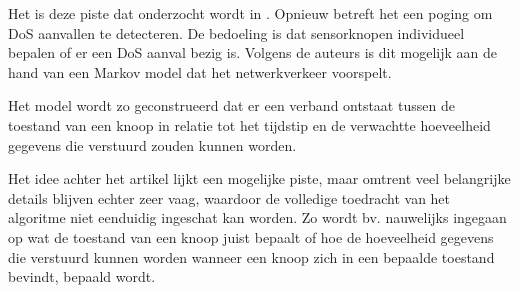 Het is deze piste dat onderzocht wordt in \citep{zhijie2012intrusion}. Opnieuw
betreft het een poging om DoS aanvallen te detecteren. De bedoeling is dat
sensorknopen individueel bepalen of er een DoS aanval bezig is. Volgens de
auteurs is dit mogelijk aan de hand van een Markov model dat het netwerkverkeer
voorspelt.

Het model wordt zo geconstrueerd dat er een verband ontstaat tussen de toestand
van een knoop in relatie tot het tijdstip en de verwachtte hoeveelheid gegevens
die verstuurd zouden kunnen worden.

Het idee achter het artikel lijkt een mogelijke piste, maar omtrent veel
belangrijke details blijven echter zeer vaag, waardoor de volledige toedracht
van het algoritme niet eenduidig ingeschat kan worden. Zo wordt bv. nauwelijks
ingegaan op wat de toestand van een knoop juist bepaalt of hoe de
hoeveelheid gegevens die verstuurd kunnen worden wanneer een knoop zich in een
bepaalde toestand bevindt, bepaald wordt.
